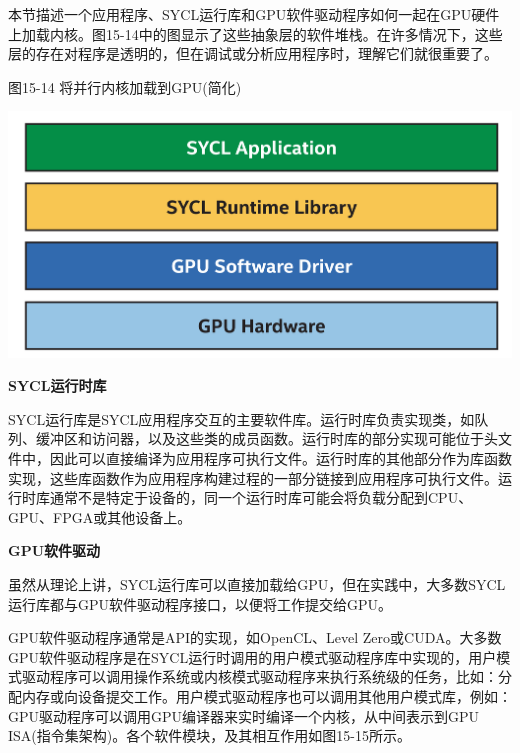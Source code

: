 本节描述一个应用程序、SYCL运行库和GPU软件驱动程序如何一起在GPU硬件上加载内核。图15-14中的图显示了这些抽象层的软件堆栈。在许多情况下，这些层的存在对程序是透明的，但在调试或分析应用程序时，理解它们就很重要了。\par

\hspace*{\fill} \par %
图15-14 将并行内核加载到GPU(简化)
\begin{center}
	\includegraphics[width=1.0\textwidth]{content/chapter-15/images/10}
\end{center}

\hspace*{\fill} \par %
\textbf{SYCL运行时库}

SYCL运行库是SYCL应用程序交互的主要软件库。运行时库负责实现类，如队列、缓冲区和访问器，以及这些类的成员函数。运行时库的部分实现可能位于头文件中，因此可以直接编译为应用程序可执行文件。运行时库的其他部分作为库函数实现，这些库函数作为应用程序构建过程的一部分链接到应用程序可执行文件。运行时库通常不是特定于设备的，同一个运行时库可能会将负载分配到CPU、GPU、FPGA或其他设备上。\par

\hspace*{\fill} \par %
\textbf{GPU软件驱动}

虽然从理论上讲，SYCL运行库可以直接加载给GPU，但在实践中，大多数SYCL运行库都与GPU软件驱动程序接口，以便将工作提交给GPU。\par

GPU软件驱动程序通常是API的实现，如OpenCL、Level Zero或CUDA。大多数GPU软件驱动程序是在SYCL运行时调用的用户模式驱动程序库中实现的，用户模式驱动程序可以调用操作系统或内核模式驱动程序来执行系统级的任务，比如：分配内存或向设备提交工作。用户模式驱动程序也可以调用其他用户模式库，例如：GPU驱动程序可以调用GPU编译器来实时编译一个内核，从中间表示到GPU ISA(指令集架构)。各个软件模块，及其相互作用如图15-15所示。\par

